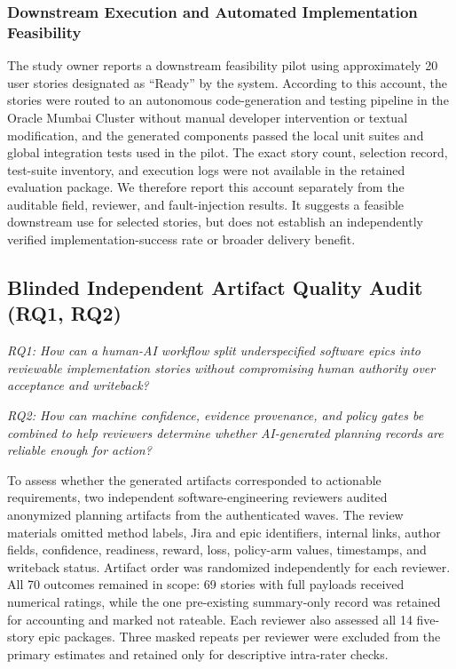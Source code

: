 \documentclass[pdflatex,sn-basic]{sn-jnl}
\begin{document}
\subsubsection{Downstream Execution and Automated Implementation Feasibility}\label{sec:downstream-implementation-pilot}
The study owner reports a downstream feasibility pilot using approximately 20 user stories designated as ``Ready'' by the system. According to this account, the stories were routed to an autonomous code-generation and testing pipeline in the Oracle Mumbai Cluster without manual developer intervention or textual modification, and the generated components passed the local unit suites and global integration tests used in the pilot. The exact story count, selection record, test-suite inventory, and execution logs were not available in the retained evaluation package. We therefore report this account separately from the auditable field, reviewer, and fault-injection results. It suggests a feasible downstream use for selected stories, but does not establish an independently verified implementation-success rate or broader delivery benefit.

\subsection{Blinded Independent Artifact Quality Audit (RQ1, RQ2)}

\noindent\textit{RQ1: How can a human-AI workflow split underspecified software epics into reviewable implementation stories without compromising human authority over acceptance and writeback?}\par
\noindent\textit{RQ2: How can machine confidence, evidence provenance, and policy gates be combined to help reviewers determine whether AI-generated planning records are reliable enough for action?}\par

To assess whether the generated artifacts corresponded to actionable requirements, two independent software-engineering reviewers audited anonymized planning artifacts from the authenticated waves. The review materials omitted method labels, Jira and epic identifiers, internal links, author fields, confidence, readiness, reward, loss, policy-arm values, timestamps, and writeback status. Artifact order was randomized independently for each reviewer. All 70 outcomes remained in scope: 69 stories with full payloads received numerical ratings, while the one pre-existing summary-only record was retained for accounting and marked not rateable. Each reviewer also assessed all 14 five-story epic packages. Three masked repeats per reviewer were excluded from the primary estimates and retained only for descriptive intra-rater checks.
\end{document}
